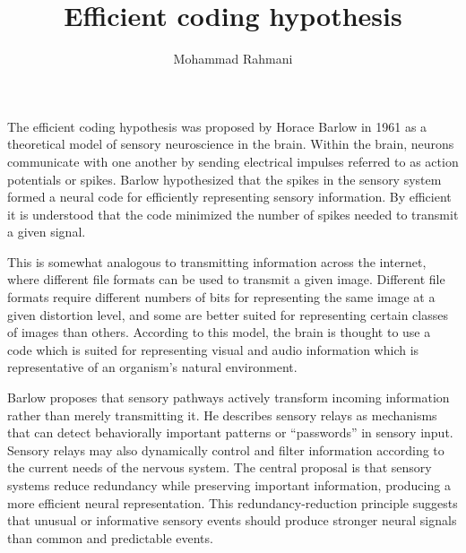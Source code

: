 \documentclass[a4paper]{article}
\title{Efficient coding hypothesis}
\date{}
\author{Mohammad Rahmani}
\begin{document}
    \maketitle

    The efficient coding hypothesis was proposed by Horace Barlow in 1961 as a theoretical model of sensory neuroscience in the brain. Within the brain, neurons communicate with one another by sending electrical impulses referred to as action potentials or spikes. Barlow hypothesized that the spikes in the sensory system formed a neural code for efficiently representing sensory information. By efficient it is understood that the code minimized the number of spikes needed to transmit a given signal.

    This is somewhat analogous to transmitting information across the internet, where different file formats can be used to transmit a given image. Different file formats require different numbers of bits for representing the same image at a given distortion level, and some are better suited for representing certain classes of images than others. According to this model, the brain is thought to use a code which is suited for representing visual and audio information which is representative of an organism's natural environment.

    Barlow proposes that sensory pathways actively transform incoming information rather than merely transmitting it. He describes sensory relays as mechanisms that can detect behaviorally important patterns or ``passwords'' in sensory input. Sensory relays may also dynamically control and filter information according to the current needs of the nervous system. The central proposal is that sensory systems reduce redundancy while preserving important information, producing a more efficient neural representation. This redundancy-reduction principle suggests that unusual or informative sensory events should produce stronger neural signals than common and predictable events.

    
    
\end{document}
